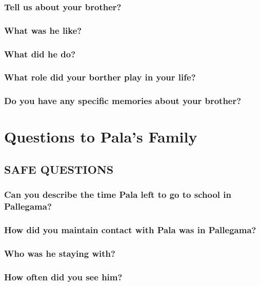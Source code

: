 \documentclass[11pt]{article}
\begin{document}
\subsubsection{Tell us about your brother?}
\label{sec:org2ffb21a}
\subsubsection{What was he like?}
\label{sec:orgde1062e}
\subsubsection{What did he do?}
\label{sec:org81e50ab}
\subsubsection{What role did your borther play in your life?}
\label{sec:org364af30}
\subsubsection{Do you have any specific memories about your brother?}
\label{sec:orgdbd2550}

\section{Questions to Pala's Family}
\label{sec:org80d1560}

\subsection{SAFE QUESTIONS}
\label{sec:org11f87f7}

\subsubsection{Can you describe the time Pala left to go to school in Pallegama?}
\label{sec:org932b66e}
\subsubsection{How did you maintain contact with Pala was in Pallegama?}
\label{sec:orgd7895d5}
\subsubsection{Who was he staying with?}
\label{sec:org219554f}
\subsubsection{How often did you see him?}
\label{sec:orgc81579d}
\end{document}
